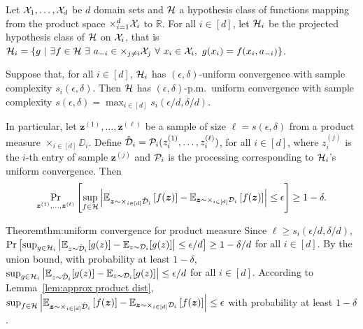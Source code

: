 \begin{theorem}\label{thm:uniform convergence for product measure}
Let ${\mathcal{X}}_1,\ldots, {\mathcal{X}}_d$ be $d$ domain sets and ${\mathcal{H}}$  a hypothesis class of functions mapping from the product space $\times_{i=1}^{d} {\mathcal{X}}_i$ to $\mathbb{R}$. For all $i\in[d]$, let ${\mathcal{H}}_i$ be the projected hypothesis class of ${\mathcal{H}}$ on ${\mathcal{X}}_i$, that is $\HH_i=\left\{g\ |\ \exists f\in \HH\ \exists\ a_{-i}\in \times_{j\neq i} \XX_j \ \forall\ x_i\in \XX_i, \ g(x_i) = f(x_i,a_{-i})\right\}$. 

Suppose that, for all $i\in [d]$, ${\mathcal{H}}_i$ has $(\epsilon,\delta)$-uniform convergence with sample complexity $s_i(\epsilon,\delta)$.  Then ${\mathcal{H}}$ has $(\epsilon,\delta)$-p.m.~uniform convergence with sample complexity $s(\epsilon,\delta) = \max_{i\in[d]} s_i(\epsilon/d,\delta/d)$.

In particular, let $\boldsymbol{z}^{(1)},\ldots, \boldsymbol{z}^{(\ell)}$ be a sample of size $\ell = s(\epsilon,\delta)$ from a product measure $\times_{i\in[d]} \DD_i$. Define $\hat{{\mathcal{D}}}_i = {\cal P}_i({z}^{(1)}_i,\ldots,z^{(\ell)}_i)$, for all $i\in[d]$, where $z^{(j)}_i$ is the $i$-th entry of sample $\boldsymbol{z}^{(j)}$ and ${\cal P}_i$ is the processing corresponding to ${\mathcal{H}}_i$'s uniform convergence. Then 
$$\Pr_{\boldsymbol{z}^{(1)},\ldots, \boldsymbol{z}^{(\ell)}}\left[\sup_{f\in {\mathcal{H}}}\left|{\mathbb{E}}_{\boldsymbol{z}\sim \times_{i\in[d]}\hat{{\mathcal{D}}}_i}\left[f(\boldsymbol{z})\right] - {\mathbb{E}}_{\boldsymbol{z}\sim \times_{i\in[d]}{{\mathcal{D}}}_i}\left[f(\boldsymbol{z})\right]\right|\leq \epsilon\right]\geq 1-\delta.$$
\end{theorem}

\begin{prevproof}{Theorem}{thm:uniform convergence for product measure}
	Since $\ell\geq s_i(\epsilon/d,\delta/d)$, $\Pr\left[\sup_{g\in {\mathcal{H}}_i}\left|{\mathbb{E}}_{z\sim \hat{{\mathcal{D}}}_i}[g(z)]- {\mathbb{E}}_{z\sim {\mathcal{D}}_i}[g(z)]\right|\leq \epsilon/d\right]\geq 1-\delta/d$ for all $i\in[d]$. By the union bound, with probability at least $1- \delta$, $\sup_{g\in {\mathcal{H}}_i}\left|{\mathbb{E}}_{z\sim \hat{{\mathcal{D}}}_i}[g(z)]- {\mathbb{E}}_{z\sim {\mathcal{D}}_i}[g(z)]\right|\leq \epsilon/d$ for all $i\in[d]$. According to Lemma~\ref{lem:approx product dist}, $\sup_{f\in {\mathcal{H}}}\left|{\mathbb{E}}_{\boldsymbol{z}\sim \times_{i\in[d]}\hat{{\mathcal{D}}}_i}\left[f(\boldsymbol{z})\right] - {\mathbb{E}}_{\boldsymbol{z}\sim \times_{i\in[d]}{{\mathcal{D}}}_i}\left[f(\boldsymbol{z})\right]\right|\leq \epsilon$ with probability at least $1- \delta$.
\end{prevproof}

